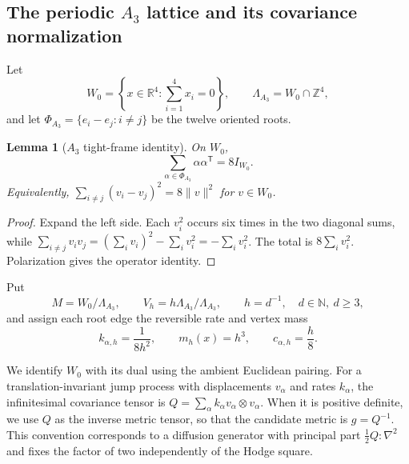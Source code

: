 \documentclass[11pt]{article}
\newtheorem{lemma}[lemma]{Lemma}
\theoremstyle{definition}
\theoremstyle{remark}
\theoremstyle{definition}
\theoremstyle{remark}
\newcommand{\N}{\mathbb N}
\newcommand{\Z}{\mathbb Z}
\newcommand{\R}{\mathbb R}
\newcommand{\norm}[1]{\lVert#1\rVert}
\begin{document}
\subsection{The periodic \texorpdfstring{$A_3$}{A3} lattice and its covariance normalization}

Let
\begin{equation}
 W_0=\left\{x\in\R^4:\sum_{i=1}^4x_i=0\right\},
 \qquad
 \Lambda_{A_3}=W_0\cap\Z^4,
 \label{eq:supp-A3-lattice}
\end{equation}
and let
$\Phi_{A_3}=\{e_i-e_j:i\ne j\}$ be the twelve oriented roots.

\begin{lemma}[$A_3$ tight-frame identity]
\label{lem:supp-A3-frame}
On $W_0$,
\begin{equation}
 {\sum_{\alpha\in\Phi_{A_3}}\alpha\alpha^{\mathsf T}=8I_{W_0}.}
 \label{eq:supp-A3-frame}
\end{equation}
Equivalently,
$\sum_{i\ne j}(v_i-v_j)^2=8\norm v^2$ for $v\in W_0$.
\end{lemma}

\begin{proof}
Expand the left side.  Each $v_i^2$ occurs six times in the two diagonal sums,
while
$\sum_{i\ne j}v_iv_j=(\sum_iv_i)^2-\sum_iv_i^2=-\sum_iv_i^2$.
The total is $8\sum_i v_i^2$.  Polarization gives the operator identity.
\end{proof}

Put
\begin{equation}
 M=W_0/\Lambda_{A_3},
 \qquad
 V_h=h\Lambda_{A_3}/\Lambda_{A_3},
 \qquad h=d^{-1},\quad d\in\N,\ d\ge3,
 \label{eq:supp-A3-torus}
\end{equation}
and assign each root edge the reversible rate and vertex mass
\begin{equation}
 k_{\alpha,h}=\frac1{8h^2},
 \qquad
 m_h(x)=h^3,
 \qquad
 c_{\alpha,h}=\frac h8.
 \label{eq:supp-A3-data}
\end{equation}


We identify $W_0$ with its dual using the ambient Euclidean pairing.  For a
translation-invariant jump process with displacements $v_\alpha$ and rates
$k_\alpha$, the infinitesimal covariance tensor is
$Q=\sum_\alpha k_\alpha v_\alpha\otimes v_\alpha$.  When it is positive definite,
we use $Q$ as the inverse metric tensor, so that the candidate metric is
$g=Q^{-1}$.  This convention corresponds to a diffusion generator with principal
part $\frac12 Q:\nabla^2$ and fixes the factor of two independently of the Hodge
square.
\end{document}
